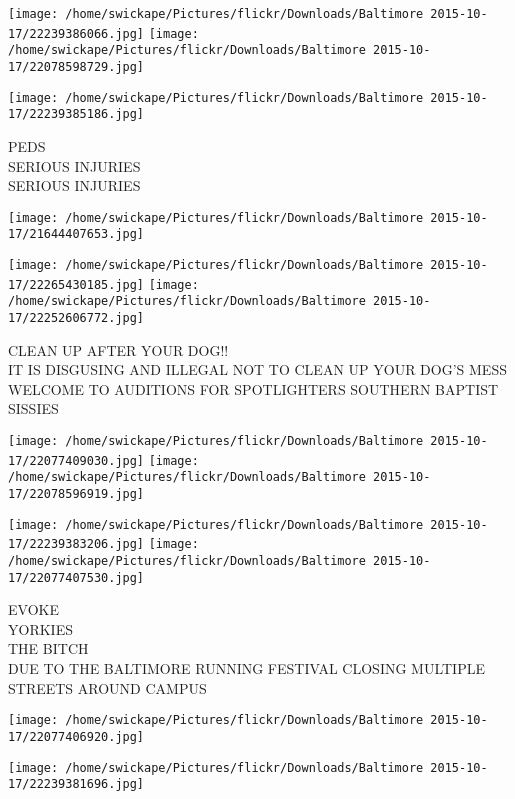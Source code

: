 \documentclass[10pt,letterpaper]{article}
\begin{document}
\texttt{[image: /home/swickape/Pictures/flickr/Downloads/Baltimore 2015-10-17/22239386066.jpg]}
\texttt{[image: /home/swickape/Pictures/flickr/Downloads/Baltimore 2015-10-17/22078598729.jpg]}

\texttt{[image: /home/swickape/Pictures/flickr/Downloads/Baltimore 2015-10-17/22239385186.jpg]}

PEDS\\
SERIOUS INJURIES\\
SERIOUS INJURIES\\
\pagebreak

\texttt{[image: /home/swickape/Pictures/flickr/Downloads/Baltimore 2015-10-17/21644407653.jpg]}

\vspace{0.25in}
\texttt{[image: /home/swickape/Pictures/flickr/Downloads/Baltimore 2015-10-17/22265430185.jpg]}
\texttt{[image: /home/swickape/Pictures/flickr/Downloads/Baltimore 2015-10-17/22252606772.jpg]}

CLEAN UP AFTER YOUR DOG!!\\
IT IS DISGUSING AND ILLEGAL NOT TO CLEAN UP YOUR DOG'S MESS\\
WELCOME TO AUDITIONS FOR SPOTLIGHTERS SOUTHERN BAPTIST SISSIES\\
\pagebreak

\texttt{[image: /home/swickape/Pictures/flickr/Downloads/Baltimore 2015-10-17/22077409030.jpg]}
\texttt{[image: /home/swickape/Pictures/flickr/Downloads/Baltimore 2015-10-17/22078596919.jpg]}

\texttt{[image: /home/swickape/Pictures/flickr/Downloads/Baltimore 2015-10-17/22239383206.jpg]}
\texttt{[image: /home/swickape/Pictures/flickr/Downloads/Baltimore 2015-10-17/22077407530.jpg]}

EVOKE\\
YORKIES\\
THE BITCH\\
DUE TO THE BALTIMORE RUNNING FESTIVAL CLOSING MULTIPLE STREETS AROUND CAMPUS\\
\pagebreak

\texttt{[image: /home/swickape/Pictures/flickr/Downloads/Baltimore 2015-10-17/22077406920.jpg]}

\vspace{0.25in}
\texttt{[image: /home/swickape/Pictures/flickr/Downloads/Baltimore 2015-10-17/22239381696.jpg]}
\end{document}
